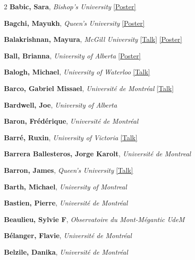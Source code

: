 \begin{small}
\begin{multicols}{2}
\textbf{Babic, Sara}, {\footnotesize\textit{Bishop's University}} \hyperref[poster-abstract-page-talk-206]{\scriptsize\textcolor{cascateal}{[Poster]}}\par
\textbf{Bagchi, Mayukh}, {\footnotesize\textit{Queen's University}} \hyperref[poster-abstract-page-talk-63]{\scriptsize\textcolor{cascateal}{[Poster]}}\par
\textbf{Balakrishnan, Mayura}, {\footnotesize\textit{McGill University}} \hyperref[abstract-page-talk-13]{\scriptsize\textcolor{cascablue}{[Talk]}} \hyperref[poster-abstract-page-talk-123]{\scriptsize\textcolor{cascateal}{[Poster]}}\par
\textbf{Ball, Brianna}, {\footnotesize\textit{University of Alberta}} \hyperref[poster-abstract-page-talk-47]{\scriptsize\textcolor{cascateal}{[Poster]}}\par
\textbf{Balogh, Michael}, {\footnotesize\textit{University of Waterloo}} \hyperref[abstract-page-talk-82]{\scriptsize\textcolor{cascablue}{[Talk]}}\par
\textbf{Barco, Gabriel Missael}, {\footnotesize\textit{Université de Montréal}} \hyperref[abstract-page-talk-317]{\scriptsize\textcolor{cascablue}{[Talk]}}\par
\textbf{Bardwell, Joe}, {\footnotesize\textit{University of Alberta}}\par
\textbf{Baron, Frédérique}, {\footnotesize\textit{Université de Montréal}}\par
\textbf{Barré, Ruxin}, {\footnotesize\textit{University of Victoria}} \hyperref[abstract-page-talk-29]{\scriptsize\textcolor{cascablue}{[Talk]}}\par
\textbf{Barrera Ballesteros, Jorge Karolt}, {\footnotesize\textit{Université de Montreal}}\par
\textbf{Barron, James}, {\footnotesize\textit{Queen's University}} \hyperref[abstract-page-talk-121]{\scriptsize\textcolor{cascablue}{[Talk]}}\par
\textbf{Barth, Michael}, {\footnotesize\textit{University of Montreal}}\par
\textbf{Bastien, Pierre}, {\footnotesize\textit{Université de Montréal}}\par
\textbf{Beaulieu, Sylvie F}, {\footnotesize\textit{Observatoire du Mont-Mégantic UdeM}}\par
\textbf{Bélanger, Flavie}, {\footnotesize\textit{Université de Montréal}}\par
\textbf{Belzile, Danika}, {\footnotesize\textit{Université de Montréal}}\par

\end{multicols}
\end{small}
